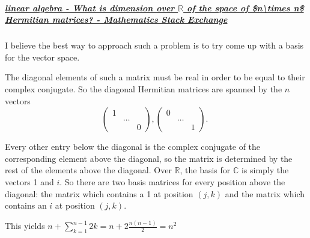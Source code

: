 \subparagraph{\href{https://math.stackexchange.com/questions/2840794/what-is-dimension-over-mathbb-r-of-the-space-of-n-times-n-hermitian-matrice}{linear algebra - What is dimension over $\mathbb R$ of the space of \$n\textbackslash{}times n\$ Hermitian matrices? - Mathematics Stack Exchange}
}
I believe the best way to approach such a problem is to try come up with a basis for the vector space.

The diagonal elements of such a matrix must be real in order to be equal to their complex conjugate. So the diagonal Hermitian matrices are spanned by the $n$ vectors
\begin{equation}
    \left(\begin{array}{lll}
1 & & \\
& \ldots & \\
& & 0
\end{array}\right),\left(\begin{array}{ccc}
0 & & \\
& \ldots & \\
& & 1
\end{array}\right) \text {. }
\end{equation}

Every other entry below the diagonal is the complex conjugate of the corresponding element above the diagonal, so the matrix is determined by the rest of the elements above the diagonal. Over $\mathbb{R}$, the basis for $\mathbb{C}$ is simply the vectors 1 and $i$. So there are two basis matrices for every position above the diagonal: the matrix which contains a 1 at position $(j, k)$ and the matrix which contains an $i$ at position $(j, k)$.

This yields $n+\sum_{k=1}^{n-1} 2 k=n+2 \frac{n(n-1)}{2}=n^2$